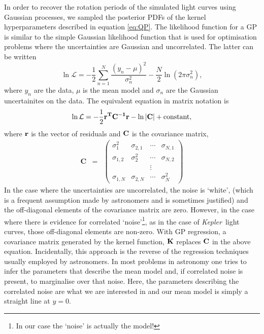 \documentclass[useAMS, usenatbib, preprint, 12pt]{aastex}
\newcommand{\Kepler}{{\it Kepler}}
\begin{document}
In order to recover the rotation periods of the simulated light curves using
Gaussian processes, we sampled the posterior PDFs of the kernel
hyperparameters described in equation \ref{eq:QP}.
The likelihood function for a GP is similar to the simple Gaussian likelihood
function that is used for optimisation problems where the uncertainties are
Gaussian and uncorrelated.
The latter can be written
\begin{equation}
\ln \mathcal{L} = -\frac{1}{2}\sum_{n=1}^N\frac{(y_n-\mu)^2}{\sigma_n^2}
    - \frac{N}{2}\ln(2\pi\sigma_n^2),
\end{equation}
\label{eq:chi2}
where $y_n$ are the data, $\mu$ is the mean model and $\sigma_n$ are the
Gaussian uncertainites on the data.
The equivalent equation in matrix notation is
\begin{equation}
\ln \mathcal{L} = -\frac{1}{2}\bf{r}^T\bf{C}^{-1}\bf{r}-\ln|\bf{C}|
    + \mathrm{constant},
\end{equation}
\label{eq:lhf1}
where $\bf{r}$ is the vector of residuals and $\bf{C}$ is the covariance
matrix,
\begin{eqnarray}
	\mathbf{C} &=& \left (\begin{array}{cccc}
	\sigma^2_1 & \sigma_{2, 1} & \cdots & \sigma_{N, 1} \\
	\sigma_{1, 2} & \sigma^2_2 & \cdots & \sigma_{N, 2} \\
    && \vdots & \\
	\sigma_{1, N} & \sigma_{2, N} & \cdots & \sigma^2_N
\end{array}\right )
\end{eqnarray}
In the case where the uncertainties are uncorrelated, the noise is `white',
(which is a frequent assumption made by astronomers and is sometimes
justified) and the off-diagonal elements of the covariance matrix are zero.
However, in the case where there is evidence for correlated
`noise'\footnote{In our case the `noise' is actually the model!}, as in the
case of \Kepler\ light curves, those off-diagonal elements are non-zero.
With GP regression, a covariance matrix generated by the kernel function,
${\bf K}$ replaces ${\bf C}$ in the above equation.
Incidentally, this approach is the reverse of the regression techniques
usually employed by astronomers.
In most problems in astronomy one tries to infer the parameters that describe
the mean model and, if correlated noise is present, to marginalise over that
noise.
Here, the parameters describing the correlated noise are what we are
interested in and our mean model is simply a straight line at $y=0$.
\end{document}
